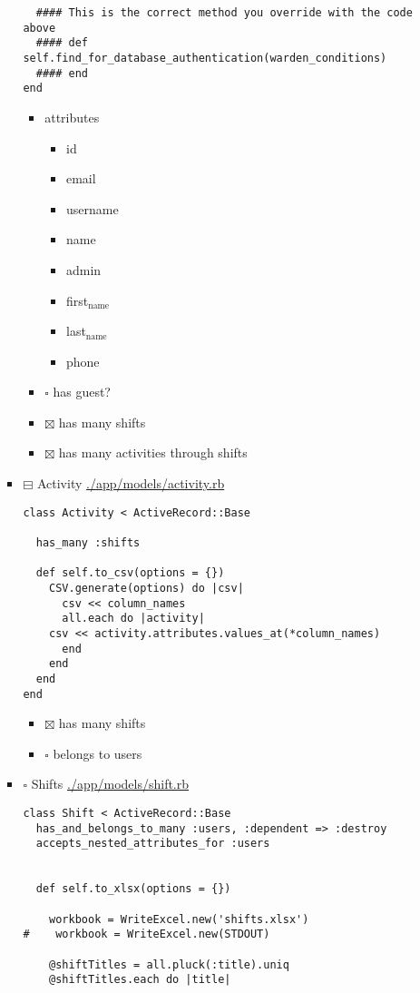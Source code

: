 \documentclass[11pt]{article}
\begin{document}
\begin{itemize}
\begin{itemize}
\begin{itemize}
\begin{verbatim}
  #### This is the correct method you override with the code above
  #### def self.find_for_database_authentication(warden_conditions)
  #### end
end
\end{verbatim}
\begin{itemize}
\item attributes
\begin{itemize}
\item id
\item email
\item username
\item name
\item admin
\item first$_{\text{name}}$
\item last$_{\text{name}}$
\item phone
\end{itemize}
\item $\square$ has guest?
\item $\boxtimes$ has many shifts
\item $\boxtimes$ has many activities through shifts
\end{itemize}
\item $\boxminus$ Activity
\url{./app/models/activity.rb}
\begin{verbatim}
class Activity < ActiveRecord::Base

  has_many :shifts

  def self.to_csv(options = {})
    CSV.generate(options) do |csv|
      csv << column_names
      all.each do |activity|
	csv << activity.attributes.values_at(*column_names)
      end
    end
  end
end
\end{verbatim}
\begin{itemize}
\item $\boxtimes$ has many shifts
\item $\square$ belongs to users
\end{itemize}
\item $\square$ Shifts
\url{./app/models/shift.rb}
\begin{verbatim}
class Shift < ActiveRecord::Base
  has_and_belongs_to_many :users, :dependent => :destroy
  accepts_nested_attributes_for :users


  def self.to_xlsx(options = {})

    workbook = WriteExcel.new('shifts.xlsx')
#    workbook = WriteExcel.new(STDOUT)

    @shiftTitles = all.pluck(:title).uniq
    @shiftTitles.each do |title|


\end{verbatim}
\end{itemize}
\end{itemize}
\end{itemize}
\end{document}
